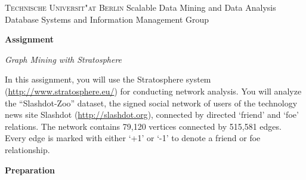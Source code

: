 \documentclass[11pt,a4paper]{article}
\begin{document}
\textsc{Technische Universit"at Berlin}{\small\hfill 
Scalable Data Mining and Data Analysis}\\
{\small Database Systems and Information Management Group}

\bigskip
\centerline{\Large\textbf{Assignment}}
\centerline{\emph{Graph Mining with Stratosphere}}
\bigskip

In this assignment, you will use the Stratosphere system (\url{http://www.stratosphere.eu/}) for conducting network analysis. You will analyze the ``Slashdot-Zoo'' dataset, the signed social network of users of the technology news site Slashdot (\url{http://slashdot.org}), connected by directed `friend' and `foe' relations. The network contains 79,120 vertices connected by 515,581 edges. Every edge is marked with either `+1' or `-1' to denote a friend or foe relationship. 

\bigskip
\centerline{\textbf{Preparation}}
\end{document}
